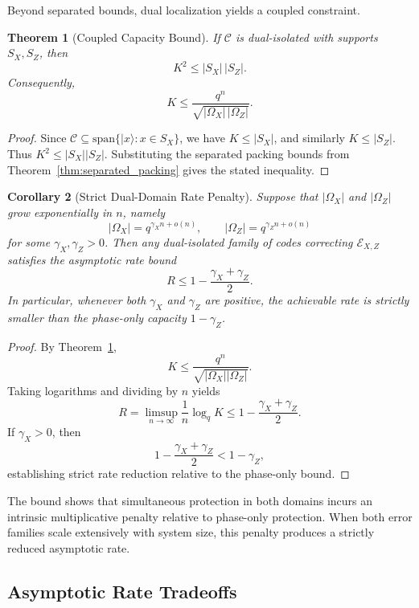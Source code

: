 \documentclass[a4paper,twocolumn,11pt,allowtoday]{quantumarticle}
\theoremstyle{plain}
\newtheorem{theorem}{Theorem}[section]
\newtheorem{corollary}[theorem]{Corollary}
\theoremstyle{definition}
\theoremstyle{remark}
\begin{document}
Beyond separated bounds, dual localization yields a
coupled constraint.

\begin{theorem}[Coupled Capacity Bound]
\label{thm:coupled_capacity}
If $\mathcal{C}$ is dual-isolated with supports $S_X,S_Z$,
then
\[
K^2 \le |S_X|\,|S_Z|.
\]
Consequently,
\[
K \le \frac{q^n}
{\sqrt{|\Omega_X|\,|\Omega_Z|}}.
\]
\end{theorem}

\begin{proof}
Since
$\mathcal{C} \subseteq \mathrm{span}\{|x\rangle : x\in S_X\}$,
we have $K\le |S_X|$,
and similarly $K\le |S_Z|$.
Thus $K^2 \le |S_X||S_Z|$.
Substituting the separated packing bounds
from Theorem~\ref{thm:separated_packing}
gives the stated inequality.
\end{proof}

\begin{corollary}[Strict Dual-Domain Rate Penalty]
\label{cor:strict_dual_penalty}
Suppose that $|\Omega_X|$ and $|\Omega_Z|$
grow exponentially in $n$, namely
\[
|\Omega_X| = q^{\gamma_X n + o(n)},
\qquad
|\Omega_Z| = q^{\gamma_Z n + o(n)}
\]
for some $\gamma_X,\gamma_Z > 0$.
Then any dual-isolated family of codes
correcting $\mathcal{E}_{X,Z}$ satisfies the
asymptotic rate bound
\[
R \le 1 - \frac{\gamma_X+\gamma_Z}{2}.
\]
In particular, whenever both
$\gamma_X$ and $\gamma_Z$ are positive,
the achievable rate is strictly smaller
than the phase-only capacity
$1-\gamma_Z$.
\end{corollary}

\begin{proof}
By Theorem~\ref{thm:coupled_capacity},
\[
K \le
\frac{q^n}{\sqrt{|\Omega_X||\Omega_Z|}}.
\]
Taking logarithms and dividing by $n$ yields
\[
R = \limsup_{n\to\infty}
\frac{1}{n}\log_q K
\le
1 - \frac{\gamma_X+\gamma_Z}{2}.
\]
If $\gamma_X>0$, then
\[
1 - \frac{\gamma_X+\gamma_Z}{2}
<
1-\gamma_Z,
\]
establishing strict rate reduction relative
to the phase-only bound.
\end{proof}

The bound shows that simultaneous protection in both
domains incurs an intrinsic multiplicative penalty
relative to phase-only protection. When both
error families scale extensively with system size,
this penalty produces a strictly reduced
asymptotic rate.


\subsection{Asymptotic Rate Tradeoffs}
\label{subsec:rate_tradeoffs}
\end{document}
